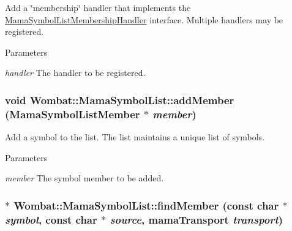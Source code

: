 Add a \char`\"{}membership\char`\"{} handler that implements the \hyperlink{classWombat_1_1MamaSymbolListMembershipHandler}{MamaSymbolListMembershipHandler} interface. Multiple handlers may be registered.


\begin{DoxyParams}{Parameters}
\item[{\em handler}]The handler to be registered. \end{DoxyParams}
\hypertarget{classWombat_1_1MamaSymbolList_a642e9f34f4834f9ec0aa4f0721eca248}{
\subsubsection[{addMember}]{\setlength{\rightskip}{0pt plus 5cm}void Wombat::MamaSymbolList::addMember ({\bf MamaSymbolListMember} $\ast$ {\em member})}}
\label{classWombat_1_1MamaSymbolList_a642e9f34f4834f9ec0aa4f0721eca248}


Add a symbol to the list. The list maintains a unique list of symbols.


\begin{DoxyParams}{Parameters}
\item[{\em member}]The symbol member to be added. \end{DoxyParams}
\hypertarget{classWombat_1_1MamaSymbolList_a939f23262e592899a253631dec0d37bf}{
\subsubsection[{findMember}]{$\ast$ Wombat::MamaSymbolList::findMember (const char $\ast$ {\em symbol}, \/  const char $\ast$ {\em source}, \/  mamaTransport {\em transport})}}
\label{classWombat_1_1MamaSymbolList_a939f23262e592899a253631dec0d37bf}


